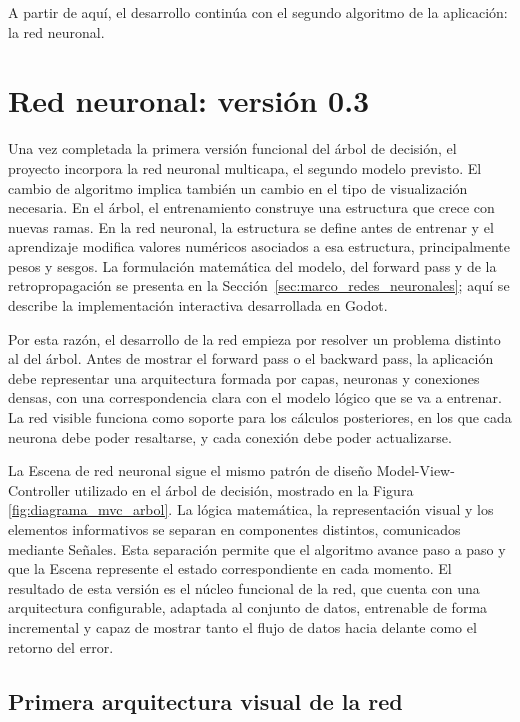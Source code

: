A partir de aquí, el desarrollo continúa con el segundo algoritmo de la aplicación: la red neuronal.



\section{Red neuronal: versión 0.3}
\label{sec:red_neuronal_version_03}

Una vez completada la primera versión funcional del árbol de decisión, el proyecto incorpora la red neuronal multicapa, el segundo modelo previsto.
El cambio de algoritmo implica también un cambio en el tipo de visualización necesaria.
En el árbol, el entrenamiento construye una estructura que crece con nuevas ramas.
En la red neuronal, la estructura se define antes de entrenar y el aprendizaje modifica valores numéricos asociados a esa estructura, principalmente pesos y sesgos.
La formulación matemática del modelo, del forward pass y de la retropropagación se presenta en la Sección~\ref{sec:marco_redes_neuronales}; aquí se describe la implementación interactiva desarrollada en Godot.

Por esta razón, el desarrollo de la red empieza por resolver un problema distinto al del árbol.
Antes de mostrar el forward pass o el backward pass, la aplicación debe representar una arquitectura formada por capas, neuronas y conexiones densas, con una correspondencia clara con el modelo lógico que se va a entrenar.
La red visible funciona como soporte para los cálculos posteriores, en los que cada neurona debe poder resaltarse, y cada conexión debe poder actualizarse.

La \gls{Escena} de red neuronal sigue el mismo patrón de diseño Model-View-Controller utilizado en el árbol de decisión, mostrado en la Figura \ref{fig:diagrama_mvc_arbol}.
La lógica matemática, la representación visual y los elementos informativos se separan en componentes distintos, comunicados mediante Señales.
Esta separación permite que el algoritmo avance paso a paso y que la \gls{Escena} represente el estado correspondiente en cada momento.
El resultado de esta versión es el núcleo funcional de la red, que cuenta con una arquitectura configurable, adaptada al conjunto de datos, entrenable de forma incremental y capaz de mostrar tanto el flujo de datos hacia delante como el retorno del error.


\subsection{Primera arquitectura visual de la red}

